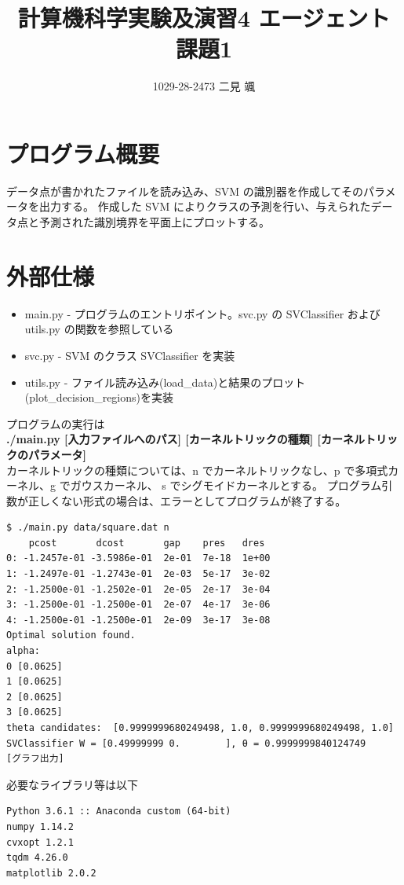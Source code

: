 \documentclass{jsarticle}
\begin{document}
\title{計算機科学実験及演習4 エージェント 課題1}
\author{1029-28-2473 二見 颯}
\maketitle

\section{プログラム概要}
データ点が書かれたファイルを読み込み、SVM の識別器を作成してそのパラメータを出力する。
作成した SVM によりクラスの予測を行い、与えられたデータ点と予測された識別境界を平面上にプロットする。

\section{外部仕様}
\begin{itemize}
    \item main.py - プログラムのエントリポイント。svc.py の SVClassifier および utils.py の関数を参照している
    \item svc.py - SVM のクラス SVClassifier を実装
    \item utils.py - ファイル読み込み(load\_data)と結果のプロット(plot\_decision\_regions)を実装
\end{itemize}
プログラムの実行は \\
{\bf ./main.py [入力ファイルへのパス] [カーネルトリックの種類] [カーネルトリックのパラメータ]}\\
カーネルトリックの種類については、n でカーネルトリックなし、p で多項式カーネル、g でガウスカーネル、
s でシグモイドカーネルとする。
プログラム引数が正しくない形式の場合は、エラーとしてプログラムが終了する。
\begin{lstlisting}
$ ./main.py data/square.dat n
    pcost       dcost       gap    pres   dres
0: -1.2457e-01 -3.5986e-01  2e-01  7e-18  1e+00
1: -1.2497e-01 -1.2743e-01  2e-03  5e-17  3e-02
2: -1.2500e-01 -1.2502e-01  2e-05  2e-17  3e-04
3: -1.2500e-01 -1.2500e-01  2e-07  4e-17  3e-06
4: -1.2500e-01 -1.2500e-01  2e-09  3e-17  3e-08
Optimal solution found.
alpha: 
0 [0.0625]
1 [0.0625]
2 [0.0625]
3 [0.0625]
theta candidates:  [0.9999999680249498, 1.0, 0.9999999680249498, 1.0]
SVClassifier W = [0.49999999 0.        ], θ = 0.9999999840124749
[グラフ出力]
\end{lstlisting}
必要なライブラリ等は以下
\begin{lstlisting}
Python 3.6.1 :: Anaconda custom (64-bit)
numpy 1.14.2
cvxopt 1.2.1
tqdm 4.26.0
matplotlib 2.0.2
\end{lstlisting}
\end{document}
